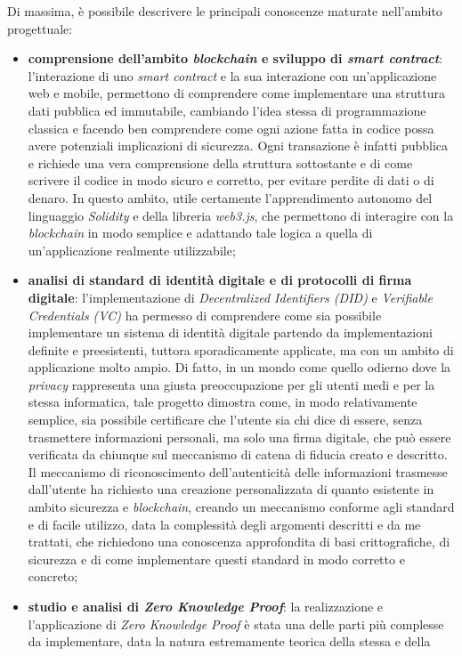Di massima, è possibile descrivere le principali conoscenze maturate nell'ambito progettuale:
\begin{itemize}
    \item \textbf{comprensione dell'ambito \textit{blockchain} e sviluppo di \textit{smart contract}}: l'interazione di uno \textit{smart contract} e la sua interazione con un'applicazione web e mobile,
    permettono di comprendere come implementare una struttura dati pubblica ed immutabile, cambiando l'idea stessa di programmazione classica e facendo ben comprendere
    come ogni azione fatta in codice possa avere potenziali implicazioni di sicurezza. Ogni transazione è infatti pubblica e richiede una vera comprensione della struttura sottostante 
    e di come scrivere il codice in modo sicuro e corretto, per evitare perdite di dati o di denaro. In questo ambito, utile certamente l'apprendimento autonomo del linguaggio \textit{Solidity} e della libreria \textit{web3.js},
    che permettono di interagire con la \textit{blockchain} in modo semplice e adattando tale logica a quella di un'applicazione realmente utilizzabile;
    \item \textbf{analisi di standard di identità digitale e di protocolli di firma digitale}: l'implementazione di \textit{Decentralized Identifiers (DID)} e \textit{Verifiable Credentials (VC)} ha permesso di comprendere come sia possibile implementare un sistema di identità digitale
    partendo da implementazioni definite e preesistenti, tuttora sporadicamente applicate, ma con un ambito di applicazione molto ampio. Di fatto, in un mondo come quello odierno dove la \textit{privacy} rappresenta una giusta preoccupazione per gli utenti medi e per la stessa informatica,
    tale progetto dimostra come, in modo relativamente semplice, sia possibile certificare che l'utente sia chi dice di essere, senza trasmettere informazioni personali, ma solo una firma digitale, che può essere verificata da chiunque sul meccanismo di catena di fiducia
    creato e descritto. Il meccanismo di riconoscimento dell'autenticità delle informazioni trasmesse dall'utente ha richiesto una creazione personalizzata di quanto esistente in ambito sicurezza e \textit{blockchain}, creando un meccanismo conforme agli standard 
    e di facile utilizzo, data la complessità degli argomenti descritti e da me trattati, che richiedono una conoscenza approfondita di basi crittografiche, di sicurezza e di come implementare questi standard in modo corretto e concreto;
    \item \textbf{studio e analisi di \textit{Zero Knowledge Proof}}: la realizzazione e l'applicazione di \textit{Zero Knowledge Proof} è stata una delle parti più complesse da implementare, data la natura estremamente teorica della stessa e della 

\end{itemize}
